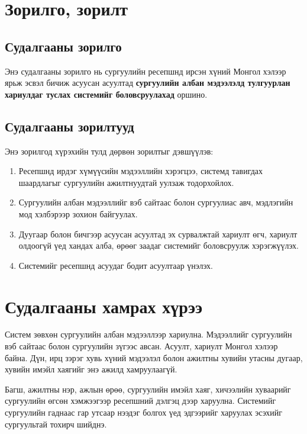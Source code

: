 \section{Зорилго, зорилт}
\label{sec:intro-goals}

\subsection{Судалгааны зорилго}

Энэ судалгааны зорилго нь сургуулийн ресепшнд ирсэн хүний Монгол хэлээр ярьж эсвэл бичиж асуусан асуултад \textbf{сургуулийн албан мэдээлэлд тулгуурлан хариулдаг туслах системийг боловсруулахад} оршино.

\subsection{Судалгааны зорилтууд}

Энэ зорилгод хүрэхийн тулд дөрвөн зорилтыг дэвшүүлэв:
\begin{enumerate}
    \item Ресепшнд ирдэг хүмүүсийн мэдээллийн хэрэгцээ, системд тавигдах шаардлагыг сургуулийн ажилтнуудтай уулзаж тодорхойлох.
    \item Сургуулийн албан мэдээллийг вэб сайтаас болон сургуулиас авч, мэдлэгийн мод хэлбэрээр зохион байгуулах.
    \item Дуугаар болон бичгээр асуусан асуултад эх сурвалжтай хариулт өгч, хариулт олдоогүй үед хандах алба, өрөөг заадаг системийг боловсруулж хэрэгжүүлэх.
    \item Системийг ресепшнд асуудаг бодит асуултаар үнэлэх.
\end{enumerate}


\section{Судалгааны хамрах хүрээ}
\label{sec:intro-scope}

Систем зөвхөн сургуулийн албан мэдээллээр хариулна. Мэдээллийг сургуулийн вэб сайтаас болон сургуулийн зүгээс авсан. Асуулт, хариулт Монгол хэлээр байна. Дүн, ирц зэрэг хувь хүний мэдээлэл болон ажилтны хувийн утасны дугаар, хувийн имэйл хаягийг энэ ажилд хамруулаагүй.

Багш, ажилтны нэр, ажлын өрөө, сургуулийн имэйл хаяг, хичээлийн хуваарийг сургуулийн өгсөн хэмжээгээр ресепшний дэлгэц дээр харуулна. Системийг сургуулийн гаднаас гар утсаар нээдэг болгох үед эдгээрийг харуулах эсэхийг сургуультай тохирч шийднэ.

